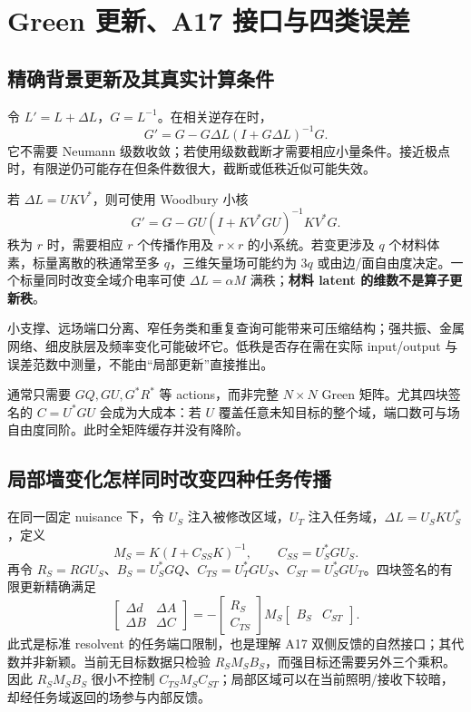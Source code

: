 \section{Green 更新、A17 接口与四类误差}
\subsection{精确背景更新及其真实计算条件}
令 $L'=L+\Delta L$，$G=L^{-1}$。在相关逆存在时，
\[
G'=G-G\Delta L(I+G\Delta L)^{-1}G.
\]
它不需要 Neumann 级数收敛；若使用级数截断才需要相应小量条件。接近极点时，有限逆仍可能存在但条件数很大，截断或低秩近似可能失效。

若 $\Delta L=U K V^*$，则可使用 Woodbury 小核
\[
G'=G-GU(I+K V^*GU)^{-1}K V^*G.
\]
秩为 $r$ 时，需要相应 $r$ 个传播作用及 $r\times r$ 的小系统。若变更涉及 $q$ 个材料体素，标量离散的秩通常至多 $q$，三维矢量场可能约为 $3q$ 或由边/面自由度决定。一个标量同时改变全域介电率可使 $\Delta L=\alpha M$ 满秩；\textbf{材料 latent 的维数不是算子更新秩}。

小支撑、远场端口分离、窄任务类和重复查询可能带来可压缩结构；强共振、金属网络、细皮肤层及频率变化可能破坏它。低秩是否存在需在实际 input/output 与误差范数中测量，不能由“局部更新”直接推出。

通常只需要 $GQ,GU,G^*R^*$ 等 actions，而非完整 $N\times N$ Green 矩阵。尤其四块签名的 $C=U^*GU$ 会成为大成本：若 $U$ 覆盖任意未知目标的整个域，端口数可与场自由度同阶。此时全矩阵缓存并没有降阶。

\subsection{局部墙变化怎样同时改变四种任务传播}
在同一固定 nuisance 下，令 $U_S$ 注入被修改区域，$U_T$ 注入任务域，$\Delta L=U_SKU_S^*$，定义
\[
M_S=K(I+C_{SS}K)^{-1},\qquad C_{SS}=U_S^*GU_S.
\]
再令 $R_S=RGU_S$、$B_S=U_S^*GQ$、$C_{TS}=U_T^*GU_S$、$C_{ST}=U_S^*GU_T$。四块签名的有限更新精确满足
\[
\boxed{
\begin{bmatrix}\Delta d&\Delta A\\\Delta B&\Delta C\end{bmatrix}
=-\begin{bmatrix}R_S\\C_{TS}\end{bmatrix}
M_S\begin{bmatrix}B_S&C_{ST}\end{bmatrix}.}
\]
此式是标准 resolvent 的任务端口限制，也是理解 A17 双侧反馈的自然接口；其代数并非新颖。当前无目标数据只检验 $R_SM_SB_S$，而强目标还需要另外三个乘积。因此 $R_SM_SB_S$ 很小不控制 $C_{TS}M_SC_{ST}$；局部区域可以在当前照明/接收下较暗，却经任务域返回的场参与内部反馈。

